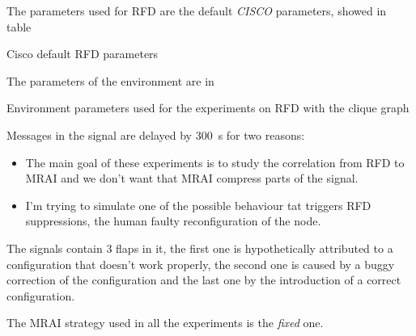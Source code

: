 The parameters used for \ac{RFD} are the default \textit{CISCO} parameters,
showed in table 

\begin{table}[h]
	
	\caption{Cisco default \ac{RFD} parameters}
	\label{tbl:cisco_rfd}
\end{table}

The parameters of the environment are in 

\begin{table}[h]
	
	\caption{Environment parameters used for the experiments on \ac{RFD}
		with the clique graph}
	\label{tbl:clique_rfd_params}
\end{table}

Messages in the signal are delayed by \SI{300}{\second} for two reasons:
\begin{itemize}
	\item The main goal of these experiments is to study the correlation from
		\ac{RFD} to \ac{MRAI} and we don't want that \ac{MRAI} compress
		parts of the signal.
	\item I'm trying to simulate one of the possible behaviour tat triggers
		\ac{RFD} suppressions, the human faulty reconfiguration of the node.
\end{itemize}

The signals contain \num{3} flaps in it, the first one is hypothetically attributed
to a configuration that doesn't work properly, the second one is caused by a
buggy correction of the configuration and the last one by the introduction of a
correct configuration.

The \ac{MRAI} strategy used in all the experiments is the \textit{fixed} one.


